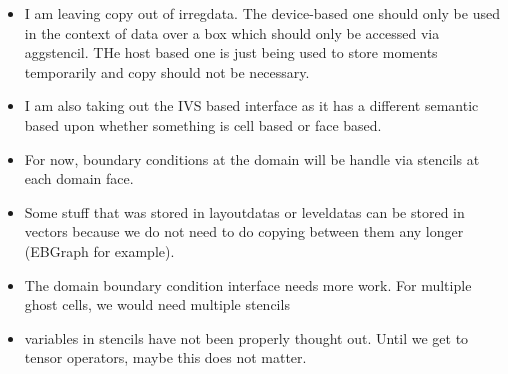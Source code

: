 \begin{itemize}
\item I am leaving copy out of irregdata.   The device-based one
  should only be used in the context of data over a box which should
  only be accessed via aggstencil.   THe host based one is just being
  used to store moments temporarily and copy should not be necessary.

\item I am also taking out the IVS based interface as it has a
  different semantic  based upon whether something is cell based or
  face based.

\item For now, boundary conditions at the domain will be handle via
  stencils at each domain face.

\item Some stuff that was stored in layoutdatas or leveldatas can be
  stored in vectors because we do not need to do copying between them
  any longer (EBGraph for example).

\item The domain boundary condition interface needs more work.    For
  multiple ghost cells, we would need multiple stencils

\item variables in stencils have not been properly thought out.  Until
  we get to tensor operators, maybe this does not matter. 
\end{itemize}

